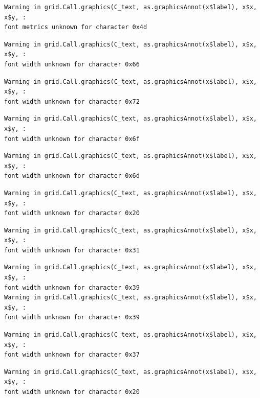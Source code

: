 \documentclass[
  letterpaper,
]{scrbook}
\begin{document}
\begin{verbatim}
Warning in grid.Call.graphics(C_text, as.graphicsAnnot(x$label), x$x, x$y, :
font metrics unknown for character 0x4d
\end{verbatim}

\begin{verbatim}
Warning in grid.Call.graphics(C_text, as.graphicsAnnot(x$label), x$x, x$y, :
font width unknown for character 0x66
\end{verbatim}

\begin{verbatim}
Warning in grid.Call.graphics(C_text, as.graphicsAnnot(x$label), x$x, x$y, :
font width unknown for character 0x72
\end{verbatim}

\begin{verbatim}
Warning in grid.Call.graphics(C_text, as.graphicsAnnot(x$label), x$x, x$y, :
font width unknown for character 0x6f
\end{verbatim}

\begin{verbatim}
Warning in grid.Call.graphics(C_text, as.graphicsAnnot(x$label), x$x, x$y, :
font width unknown for character 0x6d
\end{verbatim}

\begin{verbatim}
Warning in grid.Call.graphics(C_text, as.graphicsAnnot(x$label), x$x, x$y, :
font width unknown for character 0x20
\end{verbatim}

\begin{verbatim}
Warning in grid.Call.graphics(C_text, as.graphicsAnnot(x$label), x$x, x$y, :
font width unknown for character 0x31
\end{verbatim}

\begin{verbatim}
Warning in grid.Call.graphics(C_text, as.graphicsAnnot(x$label), x$x, x$y, :
font width unknown for character 0x39
Warning in grid.Call.graphics(C_text, as.graphicsAnnot(x$label), x$x, x$y, :
font width unknown for character 0x39
\end{verbatim}

\begin{verbatim}
Warning in grid.Call.graphics(C_text, as.graphicsAnnot(x$label), x$x, x$y, :
font width unknown for character 0x37
\end{verbatim}

\begin{verbatim}
Warning in grid.Call.graphics(C_text, as.graphicsAnnot(x$label), x$x, x$y, :
font width unknown for character 0x20
\end{verbatim}
\end{document}
